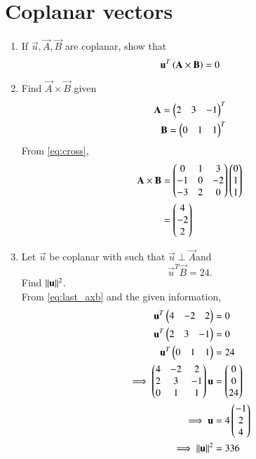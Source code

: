 \documentclass[journal,12pt,twocolumn]{IEEEtran}
\renewcommand\thesection{\arabic{section}}
\begin{document}
\section{Coplanar vectors}
\begin{enumerate}[label=\thesection.\arabic*
,ref=\thesection.\theenumi]
\item If $\vec{u}, \vec{A}, \vec{B}$ are coplanar, show that
\begin{equation}
\mathbf{u}^T\left(\mathbf{A}\times \mathbf{B}\right) = 0
\label{eq:coplanar}
\end{equation}
%
\item Find $\vec{A}\times \vec{B}$ given
\begin{align}
\mathbf{A}=\begin{pmatrix}2 & 3 & -1\end{pmatrix}^T
\\
\mathbf{B}=\begin{pmatrix}0 & 1 & 1\end{pmatrix}^T
\end{align}
\solution From \eqref{eq:cross},
\begin{align}
\mathbf{A}\times \mathbf{B} &= \begin{pmatrix}0 & 1& 3 \\ -1 & 0 & -2 \\ -3 & 2 & 0\end{pmatrix}\begin{pmatrix}0 \\ 1 \\ 1\end{pmatrix}
\\
&= \begin{pmatrix}4 \\ -2 \\ 2\end{pmatrix}
\label{eq:last_axb}
\end{align}

\item Let $\vec{u}$ be coplanar with 
%
such that $\vec{u}\perp\vec{A}$and
\begin{equation}
\vec{u}^T\vec{B} = 24.
\label{eq:uB}
\end{equation}
Find $\lVert\mathbf{u}\rVert^2$.
\\
\solution From \eqref{eq:last_axb} and the given information,
\begin{align}
\mathbf{u}^T\begin{pmatrix}4 & -2 & 2\end{pmatrix} &=0
\\
\mathbf{u}^T\begin{pmatrix}2 & 3 & -1\end{pmatrix} &=0
\\
\mathbf{u}^T\begin{pmatrix}0 & 1 & 1\end{pmatrix} &=24
\\
\implies \begin{pmatrix}4 & -2 & 2
\\
2 & 3 & -1
\\
0 & 1 & 1
\end{pmatrix}\mathbf{u}
&= \begin{pmatrix}0 \\ 0 \\ 24\end{pmatrix}
\\
\implies 
\mathbf{u} &= 4 \begin{pmatrix}-1 \\ 2 \\ 4\end{pmatrix}
\\
\implies \lVert\mathbf{u}\rVert^2 &= 336
\end{align}
\end{enumerate}
\end{document}
